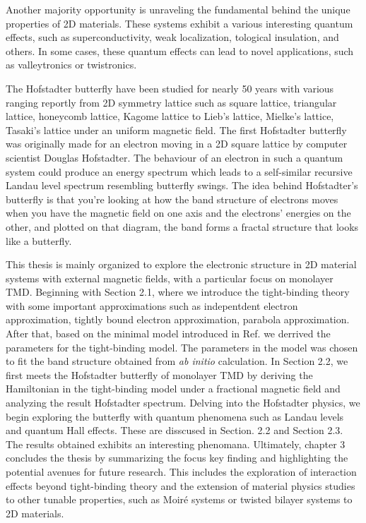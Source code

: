 \documentclass{report}
\begin{document}
Another majority opportunity is unraveling the fundamental behind the unique properties of \ac{2D} materials. These systems exhibit a various interesting quantum effects, such as superconductivity, weak localization, tological insulation, and others. In some cases, these quantum effects can lead to novel applications, such as valleytronics or twistronics.

The Hofstadter butterfly have been studied for nearly 50 years with various ranging reportly from \ac{2D} symmetry lattice such as square lattice, triangular lattice, honeycomb lattice, Kagome lattice to Lieb's lattice, Mielke's lattice, Tasaki's lattice under an uniform magnetic field. The first Hofstadter butterfly was originally made for an electron moving in a \ac{2D} square lattice by computer scientist Douglas Hofstadter. The behaviour of an electron in such a quantum system could produce an energy spectrum which leads to a self-similar recursive Landau level spectrum resembling butterfly swings. The idea behind Hofstadter’s butterfly is that you’re looking at how the band structure of electrons moves when you have the magnetic field on one axis and the electrons’ energies on the other, and plotted on that diagram, the band forms a fractal structure that looks like a butterfly.

This thesis is mainly organized to explore the electronic structure in \ac{2D} material systems with external magnetic fields, with a particular focus on monolayer \ac{TMD}. Beginning with Section 2.1, where we introduce the tight-binding theory with some important approximations such as indepentdent electron approximation, tightly bound electron approximation, parabola approximation. After that, based on the minimal model introduced in Ref. \cite{PhysRevB.88.085433} we derrived the parameters for the tight-binding model. The parameters in the model was chosen to fit the band structure obtained from \textit{ab initio} calculation. In Section 2.2, we first meets the Hofstadter butterfly of monolayer \ac{TMD} by deriving the Hamiltonian in the tight-binding model under a fractional magnetic field and analyzing the result Hofstadter spectrum. Delving into the Hofstadter physics, we begin exploring the butterfly with quantum phenomena such as Landau levels and quantum Hall effects. These are disscused in Section. 2.2 and Section 2.3. The results obtained exhibits an interesting phenomana. Ultimately, chapter 3 concludes the thesis by summarizing the focus key finding and highlighting the potential avenues for future research. This includes the exploration of interaction effects beyond tight-binding theory and the extension of material physics studies to other tunable properties, such as Moir\'e systems or twisted bilayer systems to \ac{2D} materials.
\end{document}
